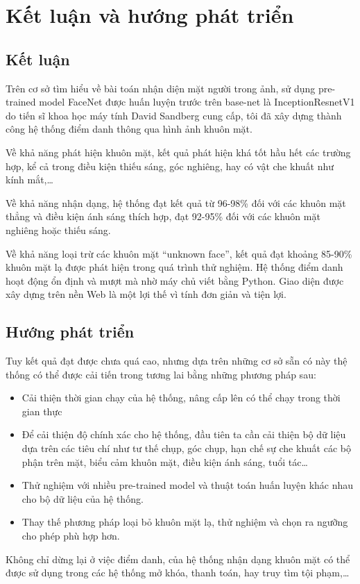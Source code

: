 \chapter{Kết luận và hướng phát triển}
\label{cha:chap4}

\section{Kết luận}
Trên cơ sở tìm hiểu về bài toán nhận diện mặt người trong ảnh, sử dụng pre-trained
model FaceNet được huấn luyện trước trên base-net là InceptionResnetV1 do
tiến sĩ khoa học máy tính David Sandberg cung cấp, tôi đã xây dựng thành công hệ
thống điểm danh thông qua hình ảnh khuôn mặt.

Về khả năng phát hiện khuôn mặt, kết quả phát hiện khá tốt hầu hết các trường hợp,
kể cả trong điều kiện thiếu sáng, góc nghiêng, hay có vật che khuất như kính mắt,…

Về khả năng nhận dạng, hệ thống đạt kết quả từ 96-98\% đối với các khuôn mặt thẳng
và điều kiện ánh sáng thích hợp, đạt 92-95\% đối với các khuôn mặt nghiêng hoặc
thiếu sáng.

Về khả năng loại trừ các khuôn mặt “unknown face”, kết quả đạt khoảng 85-90\% khuôn mặt lạ
được phát hiện trong quá trình thử nghiệm.
Hệ thống điểm danh hoạt động ổn định và mượt mà nhờ máy chủ viết bằng Python.
Giao diện được xây dựng trên nền Web là một lợi thế vì tính đơn giản và tiện lợi.

\section{Hướng phát triển}

Tuy kết quả đạt được chưa quá cao, nhưng dựa trên những cơ sở sẵn có này thệ thống có thể được cải tiến trong
tương lai bằng những phương pháp sau:

\begin{itemize}
    \item Cải thiện thời gian chạy của hệ thống, nâng cấp lên có thể chạy trong thời gian thực
    \item Để cải thiện độ chính xác cho hệ thống, đầu tiên ta cần cải thiện bộ dữ liệu dựa trên các tiêu chí như tư thế chụp, góc chụp, hạn chế sự che khuất các bộ phận trên mặt, biểu cảm khuôn mặt, điều kiện ánh sáng, tuổi tác…
    \item Thử nghiệm với nhiều pre-trained model và thuật toán huấn luyện khác nhau cho bộ dữ liệu của hệ thống.
    \item Thay thế phương pháp loại bỏ khuôn mặt lạ, thử nghiệm và chọn ra ngưỡng cho phép phù hợp hơn.
\end{itemize}

Không chỉ dừng lại ở việc điểm danh, của hệ thống nhận dạng khuôn mặt có thể được sử dụng trong các 
hệ thống mở khóa, thanh toán, hay truy tìm tội phạm,…



